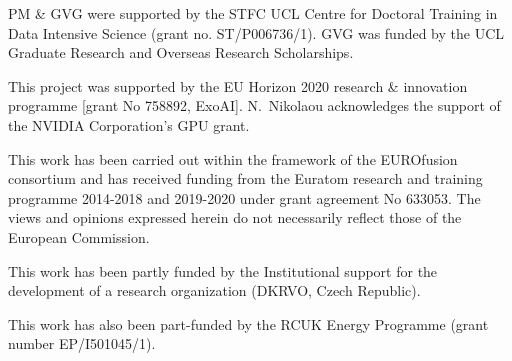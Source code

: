 PM \& GVG were supported by the STFC UCL Centre for Doctoral Training in Data Intensive
Science (grant no. ST/P006736/1). GVG was funded by the UCL Graduate Research and Overseas Research Scholarships.

This project was supported by the EU Horizon 2020 research \& innovation
programme [grant No 758892, ExoAI]. N.~Nikolaou acknowledges the support of the NVIDIA Corporation’s GPU grant.

This work has been carried out within the framework of the EUROfusion consortium and has received funding from the Euratom research and training programme 2014-2018 and 2019-2020 under grant agreement No 633053. The views and opinions expressed herein do not necessarily reflect those of the European Commission.

This work has been partly funded by the Institutional support for the
development of a research organization (DKRVO, Czech Republic).

This work has also been part-funded by the RCUK Energy Programme (grant number EP/I501045/1).
